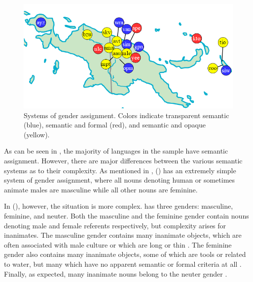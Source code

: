 \documentclass[output=collectionpaper]{langsci/langscibook}
\begin{document}
\begin{figure}[htb]
\includegraphics[width=\textwidth]{figures/09/Simple/fig4.png}
\caption{Systems of gender assignment. Colors indicate transparent semantic (blue), semantic and formal (red), and semantic and opaque (yellow).}
\label{fig:Svard:4}
\end{figure}


As can be seen in , the majority of languages in the sample have semantic assignment. However, there are major differences between the various semantic systems as to their complexity. As mentioned in ,  () has an extremely simple system of gender assignment, where all nouns denoting human or sometimes animate males are masculine while all other nouns are feminine.

In  (), however, the situation is more complex.  has three genders: masculine, feminine, and neuter. Both the masculine and the feminine gender contain nouns denoting male and female referents respectively, but complexity arises for inanimates. The masculine gender contains many inanimate objects, which are often associated with male culture or which are long or thin \citep[46]{Robinson2011}. The feminine gender also contains many inanimate objects, some of which are tools or related to water, but many which have no apparent semantic or formal criteria at all \citep[47]{Robinson2011}. Finally, as expected, many inanimate nouns belong to the neuter gender \citep[48]{Robinson2011}.
\end{document}
